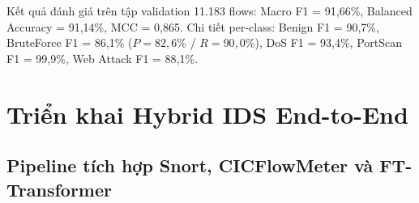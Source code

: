 \documentclass[../DoAn.tex]{subfiles}
\begin{document}
Kết quả đánh giá trên tập validation 11.183 flows: Macro F1 = 91,66\%, Balanced Accuracy = 91,14\%, MCC = 0,865. Chi tiết per-class: Benign F1 = 90,7\%, BruteForce F1 = 86,1\% ($P=82{,}6\%$ / $R=90{,}0\%$), DoS F1 = 93,4\%, PortScan F1 = 99,9\%, Web Attack F1 = 88,1\%.

\section{Triển khai Hybrid IDS End-to-End}
\label{sec:deploy}

\subsection{Pipeline tích hợp Snort, CICFlowMeter và FT-Transformer}
\label{subsec:deploy-pipeline}
\end{document}

